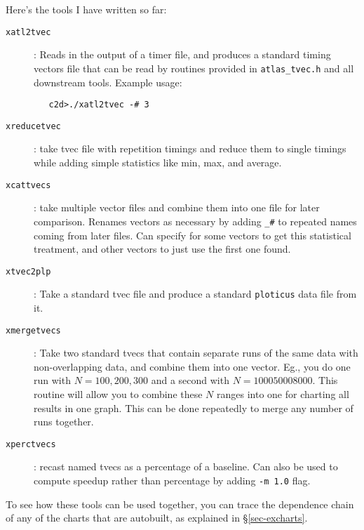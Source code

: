 \documentclass[11pt]{article}
\begin{document}
Here's the tools I have written so far:
\begin{description}
\item [{\tt xatl2tvec}]: Reads in the output of a timer file, and produces
   a standard timing vectors file that can be read by routines provided
   in {\tt atlas\_tvec.h} and all downstream tools.  Example usage:
\begin{verbatim}
   c2d>./xatl2tvec -# 3
\end{verbatim}
\item [{\tt xreducetvec}]: take tvec file with repetition timings and
      reduce them to single timings while adding simple statistics
      like min, max, and average.
\item [{\tt xcattvecs}]: take multiple vector files and combine them into
      one file for later comparison.  Renames vectors as necessary by
      adding \verb+_#+ to repeated names coming from later files.  Can
      specify for some vectors to get this statistical treatment, and
      other vectors to just use the first one found.
\item [{\tt xtvec2plp}]: Take a standard tvec file and produce a standard
      {\tt ploticus} data file from it.
\item [{\tt xmergetvecs}]: Take two standard tvecs that contain separate runs
      of the same data with non-overlapping data, and combine them into
      one vector.  Eg., you do one run with $N=100,200, 300$ and a second
      with $N=1000 5000 8000$.  This routine will allow you to combine 
      these $N$ ranges into one for charting all results in one graph.
      This can be done repeatedly to merge any number of runs together.
\item [{\tt xperctvecs}]: recast named tvecs as a percentage of a baseline.
      Can also be used to compute speedup rather than percentage by adding
      \texttt{-m 1.0} flag.
\end{description}

To see how these tools can be used together, you can trace the dependence
chain of any of the charts that are autobuilt, as explained in
\S\ref{sec-excharts}.
\end{document}
